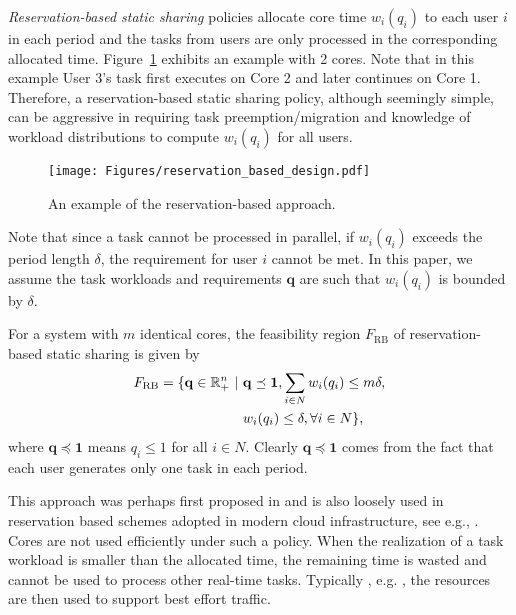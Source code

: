 \documentclass[prodmode,acmtompecs]{acmsmall}
\newcommand{\reqvec}{\mathbf{q}}
\newcommand{\reqscalar}{q}
\newcommand{\feasibilityRegion}{F}
\newcommand{\fullUserSet}{N}
\begin{document}
{\em Reservation-based static sharing} policies allocate core time $w_i(q_i)$ to each user $i$ in each period and the tasks from users are only processed in the corresponding allocated time. Figure~{\ref{fig_reservation_based_design}} exhibits an example with 2 cores. Note that in this example User 3's task first executes on Core 2 and later continues on Core 1. Therefore, a reservation-based static sharing policy, although seemingly simple, can be aggressive in requiring task preemption/migration and knowledge of workload distributions to compute $w_i(\reqscalar_i)$ for all users. 

\begin{figure}[htp]
  \centering
  \texttt{[image: Figures/reservation\_based\_design.pdf]}
  \caption{An example of the reservation-based approach. }
  \label{fig_reservation_based_design}
\end{figure}

Note that since a task cannot be processed in parallel, if $w_i(q_i)$ exceeds the period length $\delta$, the requirement for user $i$ cannot be met. In this paper, we assume the task workloads and requirements $\reqvec$ are such that $w_i(q_i)$ is bounded by $\delta$. 

For a system with $m$ identical cores, the feasibility region $\feasibilityRegion_{\text{RB}}$ of reservation-based static sharing is given by
\begin{align}
\feasibilityRegion_{\text{RB}} = \{ \reqvec \in \mathbb R^n_+ ~|~ & \reqvec \preceq \mathbf{1}, \sum\limits_{i \in \fullUserSet} w_i(q_i) \leq m\delta, 	\notag \\
& w_i(q_i) \leq \delta, \forall i \in \fullUserSet \}, \label{align_F_RB_MIC}
\end{align}
where $\reqvec \preceq \mathbf{1}$ means $\reqscalar_i \leq 1$ for all $i \in \fullUserSet$. 
Clearly $\reqvec \preceq \mathbf{1}$ comes from the fact that each user generates only one task in each period. 

This approach was perhaps first proposed in \cite{AtB98A} and is also loosely used in reservation based schemes adopted in modern cloud infrastructure, see e.g., \cite{VPK15A}. 
Cores are not used efficiently under such a policy. When the realization of a task workload is smaller than the allocated time, the remaining time is wasted and cannot be used to process other real-time tasks. 
Typically , e.g. \cite{VPK15A}, the resources are then used to support best effort traffic. 
\end{document}
